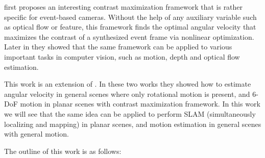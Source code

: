 \citet{gallego2017accurate} first proposes an interesting contrast
maximization framework that is rather specific for event-based
cameras. Without the help of any auxiliary variable such as optical
flow or feature, this framework finds the optimal angular velocity
that maximizes the contrast of a synthesized event frame via nonlinear
optimization. Later in \citep{gallego2018unifying} they showed that
the same framework can be applied to various important tasks in
computer vision, such as motion, depth and optical flow estimation.

This work is an extension of \citep{gallego2017accurate,
  gallego2018unifying}. In these two works they showed how to estimate
angular velocity in general scenes where only rotational motion is
present, and 6-DoF motion in planar scenes with contrast maximization
framework. In this work we will see that the same idea can be applied
to perform SLAM (simultaneously localizing and mapping) in planar
scenes, and motion estimation in general scenes with general motion.

The outline of this work is as follows:
